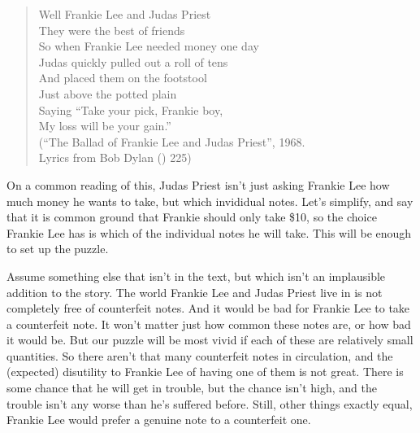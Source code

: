 \documentclass[
  11pt,
  letterpaper,
  DIV=11,
  numbers=noendperiod,
  oneside]{scrartcl}
\begin{document}
\begin{quote}
Well Frankie Lee and Judas Priest\\
They were the best of friends\\
So when Frankie Lee needed money one day\\
Judas quickly pulled out a roll of tens\\
And placed them on the footstool\\
Just above the potted plain\\
Saying ``Take your pick, Frankie boy,\\
My loss will be your gain.''\\
\hspace*{0.333em}\hspace*{0.333em}\hspace*{0.333em}\hspace*{0.333em}\hspace*{0.333em}\hspace*{0.333em}\hspace*{0.333em}\hspace*{0.333em}\hspace*{0.333em}\hspace*{0.333em}(``The
Ballad of Frankie Lee and Judas Priest'', 1968.\\
\hspace*{0.333em}\hspace*{0.333em}\hspace*{0.333em}\hspace*{0.333em}\hspace*{0.333em}\hspace*{0.333em}\hspace*{0.333em}\hspace*{0.333em}\hspace*{0.333em}\hspace*{0.333em}\hspace*{0.333em}Lyrics
from Bob Dylan () 225)
\end{quote}

On a common reading of this, Judas Priest isn't just asking Frankie Lee
how much money he wants to take, but which invididual notes. Let's
simplify, and say that it is common ground that Frankie should only take
\$10, so the choice Frankie Lee has is which of the individual notes he
will take. This will be enough to set up the puzzle.

Assume something else that isn't in the text, but which isn't an
implausible addition to the story. The world Frankie Lee and Judas
Priest live in is not completely free of counterfeit notes. And it would
be bad for Frankie Lee to take a counterfeit note. It won't matter just
how common these notes are, or how bad it would be. But our puzzle will
be most vivid if each of these are relatively small quantities. So there
aren't that many counterfeit notes in circulation, and the (expected)
disutility to Frankie Lee of having one of them is not great. There is
some chance that he will get in trouble, but the chance isn't high, and
the trouble isn't any worse than he's suffered before. Still, other
things exactly equal, Frankie Lee would prefer a genuine note to a
counterfeit one.
\end{document}
